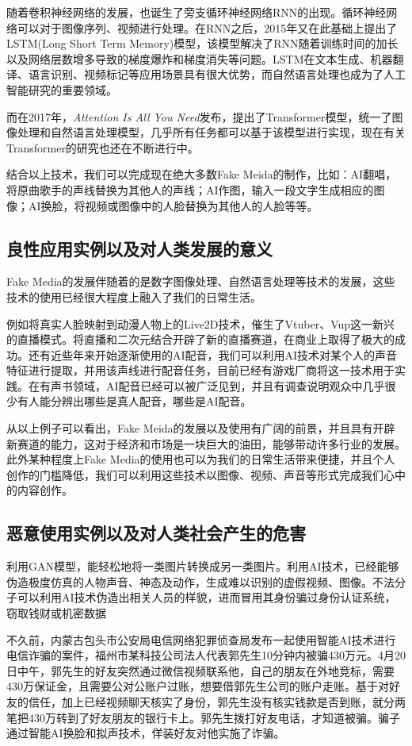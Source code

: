 \documentclass[12pt]{article} %
\begin{document}
随着卷积神经网络的发展，也诞生了旁支循环神经网络RNN的出现。循环神经网络可以对于图像序列、视频进行处理。在RNN之后，2015年又在此基础上提出了LSTM(Long Short Term Memory)模型，该模型解决了RNN随着训练时间的加长以及网络层数增多导致的梯度爆炸和梯度消失等问题。LSTM在文本生成、机器翻译、语言识别、视频标记等应用场景具有很大优势，而自然语言处理也成为了人工智能研究的重要领域。

而在2017年，\textit{Attention Is All You Need}发布，提出了Transformer模型，统一了图像处理和自然语言处理模型，几乎所有任务都可以基于该模型进行实现，现在有关Transformer的研究也还在不断进行中。

结合以上技术，我们可以完成现在绝大多数Fake Meida的制作，比如：AI翻唱，将原曲歌手的声线替换为其他人的声线；AI作图，输入一段文字生成相应的图像；AI换脸，将视频或图像中的人脸替换为其他人的人脸等等。
\subsection{良性应用实例以及对人类发展的意义}
Fake Media的发展伴随着的是数字图像处理、自然语言处理等技术的发展，这些技术的使用已经很大程度上融入了我们的日常生活。

例如将真实人脸映射到动漫人物上的Live2D技术，催生了Vtuber、Vup这一新兴的直播模式。将直播和二次元结合开辟了新的直播赛道，在商业上取得了极大的成功。还有近些年来开始逐渐使用的AI配音，我们可以利用AI技术对某个人的声音特征进行提取，并用该声线进行配音任务，目前已经有游戏厂商将这一技术用于实践。在有声书领域，AI配音已经可以被广泛见到，并且有调查说明观众中几乎很少有人能分辨出哪些是真人配音，哪些是AI配音。

从以上例子可以看出，Fake Meida的发展以及使用有广阔的前景，并且具有开辟新赛道的能力，这对于经济和市场是一块巨大的油田，能够带动许多行业的发展。此外某种程度上Fake Media的使用也可以为我们的日常生活带来便捷，并且个人创作的门槛降低，我们可以利用这些技术以图像、视频、声音等形式完成我们心中的内容创作。
\subsection{恶意使用实例以及对人类社会产生的危害}
利用GAN模型，能轻松地将一类图片转换成另一类图片。利用AI技术，已经能够伪造极度仿真的人物声音、神态及动作，生成难以识别的虚假视频、图像。不法分子可以利用AI技术伪造出相关人员的样貌，进而冒用其身份骗过身份认证系统，窃取钱财或机密数据

不久前，内蒙古包头市公安局电信网络犯罪侦查局发布一起使用智能AI技术进行电信诈骗的案件，福州市某科技公司法人代表郭先生10分钟内被骗430万元。4月20日中午，郭先生的好友突然通过微信视频联系他，自己的朋友在外地竞标，需要430万保证金，且需要公对公账户过账，想要借郭先生公司的账户走账。基于对好友的信任，加上已经视频聊天核实了身份，郭先生没有核实钱款是否到账，就分两笔把430万转到了好友朋友的银行卡上。郭先生拨打好友电话，才知道被骗。骗子通过智能AI换脸和拟声技术，佯装好友对他实施了诈骗。
\end{document}
